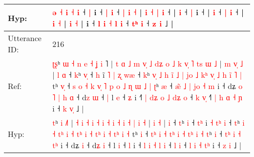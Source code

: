 \documentclass[10pt]{article}
\DeclareRobustCommand{\hl}[1]{{\textcolor{red}{#1}}}
\begin{document}
\begin{longtable}{ll}
 \\
Hyp: & \hl{ə} \hl{˧} \hl{i} \hl{}\hl{˧} \hl{}\hl{i} ˧ \hl{|} i\hl{} ˧ \hl{}\hl{}\hl{|} \hl{i} ˧ \hl{}\hl{|} \hl{i} \hl{˧} |\hl{}\hl{} \hl{i} \hl{˧} \hl{|} \hl{i} ˧ |\hl{}\hl{} \hl{i} ˧ \hl{|} i ˧ |\hl{}\hl{} \hl{i} ˧ \hl{|} \hl{}\hl{i} ˧\hl{} |\hl{}\hl{} \hl{i} \hl{}\hl{˧} |\hl{}\hl{} \hl{}\hl{i} \hl{}\hl{˧} |\hl{}\hl{} i ˧ \hl{l} \hl{i} \hl{˧} \hl{l} \hl{i} ˧ \hl{t}\hl{ʰ} \hl{i} ˧ \hl{}\hl{z} \hl{i} ˩ |
 \\
\midrule
Utterance ID: & 216 \\
Ref: & \hl{ʈ}\hl{ʂ}ʰ\hl{ }\hl{ɯ}\hl{ }\hl{˧}\hl{ }\hl{n}\hl{ }\hl{e}\hl{ }\hl{˧} \hl{ʝ} \hl{i}\hl{ }˥ |\hl{ }\hl{t} \hl{ɑ} \hl{˩} \hl{m} \hl{v}\hl{̩} \hl{˩} \hl{d}\hl{ʑ} \hl{o} \hl{˩} \hl{k} \hl{v}\hl{̩} \hl{˥} \hl{t}\hl{s} \hl{ɯ} \hl{˩} |\hl{ }\hl{m} \hl{v}\hl{̩} \hl{˩} |\hl{ }\hl{l} \hl{ɑ} ˧ \hl{k}ʰ \hl{v}\hl{̩} ˧ \hl{}\hl{h} i\hl{̃} \hl{˥} \hl{|}\hl{ }\hl{ʐ} \hl{w}\hl{æ} ˧ \hl{k}ʰ\hl{ }\hl{v}\hl{̩} \hl{˩} \hl{h} \hl{i}\hl{̃} \hl{˩} \hl{|} \hl{j}\hl{o} \hl{˩} \hl{k}\hl{ʰ} \hl{v}\hl{̩} \hl{˩} \hl{h} \hl{i}\hl{̃} \hl{˥} \hl{|} tʰ \hl{v}\hl{̩} ˧\hl{ }\hl{s} \hl{o}\hl{ }\hl{˧} \hl{k} \hl{v}\hl{̩} \hl{˥}\hl{ }\hl{p} \hl{o} \hl{˩} \hl{ɳ}\hl{ }\hl{ɯ} \hl{˩} \hl{|} \hl{ʈ}ʰ \hl{æ} ˧ \hl{æ}\hl{̃}\hl{ }\hl{˩} \hl{|} \hl{j}\hl{o} \hl{˧}\hl{ }\hl{m} i ˧ dʑ\hl{ }\hl{o}\hl{ }\hl{˥}\hl{ }\hl{|}\hl{ }\hl{h} \hl{ɑ} ˧ d\hl{z} \hl{ɯ} ˧\hl{ }\hl{|} l \hl{e} ˧ \hl{ʑ} i ˧\hl{˥}\hl{ }\hl{|} \hl{d}\hl{ʑ} \hl{o} \hl{˩} \hl{d}\hl{ʑ} \hl{o} ˧ \hl{k} \hl{v}\hl{̩} ˧\hl{˥} \hl{|} \hl{h} \hl{ɑ} \hl{˧}\hl{ }\hl{ɲ} i ˧ \hl{k} \hl{v}\hl{̩} ˩ |
 \\
Hyp: & \hl{}\hl{t}ʰ\hl{}\hl{}\hl{}\hl{}\hl{}\hl{}\hl{}\hl{}\hl{}\hl{} \hl{i} \hl{}\hl{˩}˥ |\hl{}\hl{} \hl{˧} \hl{i} \hl{˧} \hl{}\hl{i} \hl{˧} \hl{}\hl{i} \hl{˧} \hl{i} \hl{˧} \hl{}\hl{i} \hl{˧} \hl{}\hl{|} \hl{i} \hl{˧} |\hl{}\hl{} \hl{}\hl{i} \hl{˧} |\hl{}\hl{} \hl{i} ˧ \hl{t}ʰ \hl{}\hl{i} ˧ \hl{t}\hl{ʰ} i\hl{} \hl{˧} \hl{}\hl{t}\hl{ʰ} \hl{}\hl{i} ˧ \hl{t}ʰ\hl{}\hl{}\hl{} \hl{i} \hl{˧} \hl{t}\hl{ʰ} \hl{i} \hl{˧} \hl{t}\hl{ʰ} \hl{i} \hl{}\hl{˧} \hl{t}\hl{ʰ} \hl{i} \hl{˧} \hl{t}\hl{ʰ} \hl{i} \hl{˧} tʰ \hl{}\hl{i} ˧\hl{}\hl{} \hl{}\hl{t}\hl{ʰ} \hl{i} \hl{}\hl{˧} \hl{}\hl{t}\hl{ʰ} \hl{i} \hl{˧} \hl{}\hl{t}\hl{ʰ} \hl{i} \hl{˧} \hl{t}ʰ \hl{i} ˧ \hl{}\hl{}\hl{t}\hl{ʰ} \hl{i} \hl{}\hl{˧} \hl{}\hl{t}\hl{ʰ} i ˧ dʑ\hl{}\hl{}\hl{}\hl{}\hl{}\hl{}\hl{}\hl{} \hl{i} ˧ d\hl{ʑ} \hl{i} ˧\hl{}\hl{} l \hl{i} ˧ \hl{l} i ˧\hl{}\hl{}\hl{} \hl{}\hl{l} \hl{i} \hl{˧} \hl{}\hl{l} \hl{i} ˧ \hl{l} \hl{}\hl{i} ˧\hl{} \hl{l} \hl{i} \hl{˧} \hl{}\hl{t}\hl{ʰ} i ˧ \hl{z} \hl{}\hl{i} ˩ |

\end{longtable}
\end{document}
